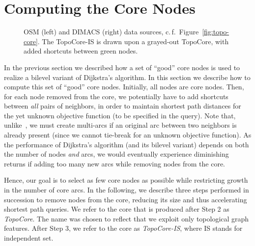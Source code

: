 \documentclass{sig-alternate}
\newcommand{\cf}{c.\,f.\xspace}
\begin{document}
\section{Computing the Core Nodes}\label{sec:core}

\begin{figure}






\begin{centering}
\par\end{centering}

\caption{
OSM (left) and DIMACS (right) data sources, \cf~Figure~\ref{fig:topo-core}.
The TopoCore-IS is drawn upon a grayed-out TopoCore, with added shortcuts between green nodes.
}
\label{fig:topo-core-is}
\end{figure}


In the previous section we described how a set of ``good'' core nodes is
used to realize a bilevel variant of Dijkstra's algorithm. In this
section we describe how to compute this set of ``good'' core nodes.
Initially, all nodes are core nodes. 
Then, for each node removed from the core, we potentially have to add shortcuts between \emph{all} pairs of neighbors, in order to maintain shortest path distances for the yet unknown objective function (to be specified in the query). Note that, unlike~\cite{dsw-cch-sea-14}, we must create multi-arcs if an original arc between two neighbors is already present (since we cannot tie-break for an unknown objective function). As the performance of Dijkstra's algorithm (and its bilevel variant) depends on both the number of nodes \emph{and} arcs, we would eventually experience diminishing returns if adding too many new arcs while removing nodes from the core.

Hence, our goal is to select as few core nodes as possible while restricting growth in the number of core arcs.
In the following, we describe three steps performed in succession to remove
nodes from the core, reducing its size and thus accelerating shortest
path queries. We refer to the core that is produced after Step 2 as
\emph{TopoCore}. The name was chosen to reflect that we exploit only
topological graph features. After Step 3, we refer to the core as \emph{TopoCore-IS}, where IS stands for independent set. 
\end{document}
